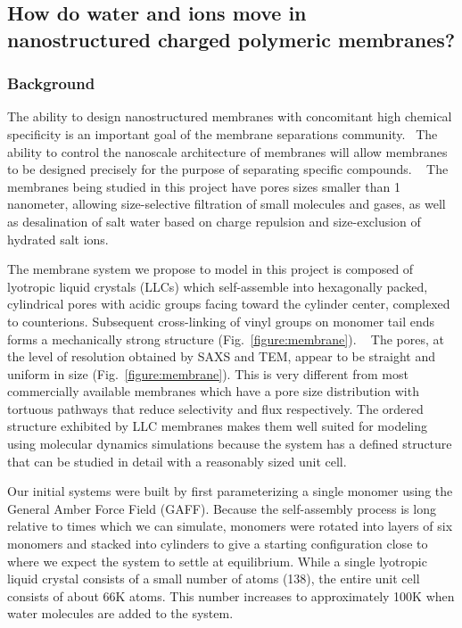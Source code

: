 \subsection{How do water and ions move in nanostructured charged polymeric membranes?}
\subsubsection*{Background} 

The ability to design nanostructured membranes with concomitant high chemical
specificity is an important goal of the membrane separations
community.~\cite{Humplik2011} The ability to control
the nanoscale architecture of membranes will allow membranes to be 
designed precisely for the purpose of separating specific compounds.
~\cite{SmithRC1997,Zhu2006} The membranes being studied in this project
have pores sizes smaller than 1 nanometer, allowing size-selective 
filtration of small molecules and gases, as well as desalination of salt
water based on charge repulsion and size-exclusion of hydrated salt ions.

The membrane system we propose to model in this project is composed of
lyotropic liquid crystals (LLCs) which self-assemble into hexagonally
packed, cylindrical pores with acidic groups facing toward the cylinder
center, complexed to counterions. Subsequent cross-linking of vinyl
groups on monomer tail ends forms a mechanically strong structure
(Fig.~\ref{figure:membrane}). ~\cite{Zhou2003,Feng2014,Feng2016}
The pores, at the level of resolution obtained by SAXS and TEM, appear
to be straight and uniform in size (Fig.~\ref{figure:membrane}). 
This is very different from most commercially available membranes 
which have a pore size distribution with tortuous pathways that reduce
selectivity and flux respectively. The ordered structure exhibited by
LLC membranes makes them well suited for modeling using molecular 
dynamics simulations because the system has a defined structure that
can be studied in detail with a reasonably sized unit cell.

Our initial systems were built by first parameterizing a single
monomer using the General Amber Force Field (GAFF). Because the
self-assembly process is long relative to times which we can simulate,
monomers were rotated into layers of six monomers and stacked into
cylinders to give a starting configuration close to where we expect
the system to settle at equilibrium. While a single lyotropic liquid
crystal consists of a small number of atoms (138), the entire unit
cell consists of about 66K atoms. This number increases to 
approximately 100K when water molecules are added to the system.

